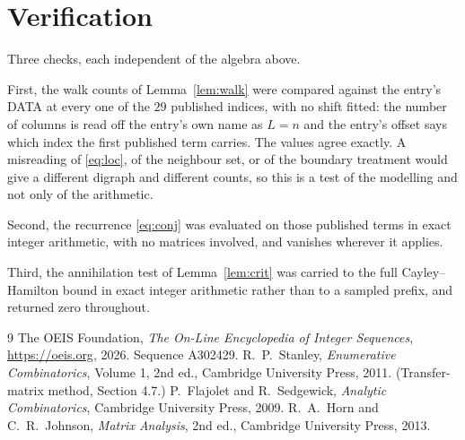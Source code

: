 \documentclass[11pt,a4paper]{article}
\theoremstyle{plain}
\theoremstyle{definition}
\begin{document}
\section{Verification}

Three checks, each independent of the algebra above.

First, the walk counts of Lemma~\ref{lem:walk} were compared against the entry's DATA at
every one of the $29$ published indices, with no shift fitted: the number of columns is
read off the entry's own name as $L=n$ and the entry's offset says which index the first
published term carries. The values agree exactly. A misreading of \eqref{eq:loc}, of the
neighbour set, or of the boundary treatment would give a different digraph and different
counts, so this is a test of the modelling and not only of the arithmetic.

Second, the recurrence \eqref{eq:conj} was evaluated on those published terms in exact
integer arithmetic, with no matrices involved, and vanishes wherever it applies.

Third, the annihilation test of Lemma~\ref{lem:crit} was carried to the full
Cayley--Hamilton bound in exact integer arithmetic rather than to a sampled prefix, and
returned zero throughout.

\begin{thebibliography}{9}
 The OEIS Foundation, \emph{The On-Line Encyclopedia of Integer
Sequences}, \url{https://oeis.org}, 2026. Sequence A302429.
 R.~P.~Stanley, \emph{Enumerative Combinatorics}, Volume 1, 2nd ed.,
Cambridge University Press, 2011. (Transfer-matrix method, Section 4.7.)
 P.~Flajolet and R.~Sedgewick, \emph{Analytic Combinatorics}, Cambridge
University Press, 2009.
 R.~A.~Horn and C.~R.~Johnson, \emph{Matrix Analysis}, 2nd ed., Cambridge
University Press, 2013.
\end{thebibliography}
\end{document}
